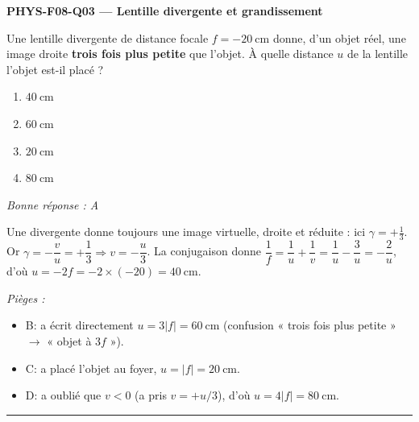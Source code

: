 \documentclass[11pt,a4paper]{article}
\begin{document}
\noindent\textbf{PHYS-F08-Q03 --- Lentille divergente et grandissement}\par
Une lentille divergente de distance focale $f=\qty{-20}{\centi\metre}$ donne, d'un objet réel, une image
droite \textbf{trois fois plus petite} que l'objet. À quelle distance $u$ de la lentille l'objet est-il placé ?
\begin{enumerate}[label=\Alph*)]
\item $\qty{40}{\centi\metre}$
\item $\qty{60}{\centi\metre}$
\item $\qty{20}{\centi\metre}$
\item $\qty{80}{\centi\metre}$
\end{enumerate}
\textit{Bonne réponse : A}\par
Une divergente donne toujours une image virtuelle, droite et réduite : ici $\gamma=+\tfrac13$.
Or $\gamma=-\dfrac{v}{u}=+\dfrac13\Rightarrow v=-\dfrac{u}{3}$. La conjugaison donne
$\dfrac1f=\dfrac1u+\dfrac1v=\dfrac1u-\dfrac3u=-\dfrac2u$, d'où $u=-2f=-2\times(-20)=\qty{40}{\centi\metre}$.\par
\textit{Pièges :}
\begin{itemize}
\item B: a écrit directement $u=3|f|=\qty{60}{\centi\metre}$ (confusion « trois fois plus petite » $\to$ « objet à $3f$ »).
\item C: a placé l'objet au foyer, $u=|f|=\qty{20}{\centi\metre}$.
\item D: a oublié que $v<0$ (a pris $v=+u/3$), d'où $u=4|f|=\qty{80}{\centi\metre}$.
\end{itemize}
\vspace{8pt}\hrule\vspace{8pt}
\end{document}
